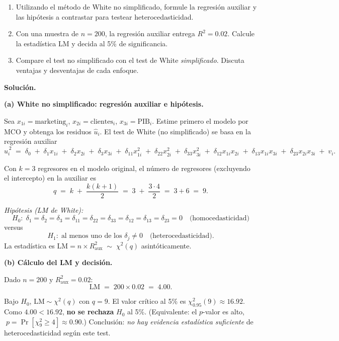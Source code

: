 \documentclass[10pt,a4paper]{article}
\begin{document}
\begin{enumerate}
\begin{enumerate}
\item Utilizando el método de White no simplificado, formule la {regresión auxiliar} y las {hipótesis} a contrastar para testear heterocedasticidad.

\item Con una muestra de \(n=200\), la regresión auxiliar entrega \(R^2 = 0{.}02\).
Calcule la estadística LM y decida al 5\% de significancia.

\item Compare el test no simplificado con el test de White \emph{simplificado}. Discuta ventajas y desventajas de cada enfoque.
\end{enumerate}


\textbf{Solución.}

\textbf{(a) White no simplificado: regresión auxiliar e hipótesis.}

Sea \(x_{1i}=\text{marketing}_i\), \(x_{2i}=\text{clientes}_i\), \(x_{3i}=\text{PIB}_i\).
Estime primero el modelo por MCO y obtenga los residuos \(\hat u_i\).
El test de White (no simplificado) se basa en la regresión auxiliar
\[
\hat u_i^{\,2} \;=\; \delta_0 \;+\; \delta_1 x_{1i} \;+\; \delta_2 x_{2i} \;+\; \delta_3 x_{3i}
\;+\; \delta_{11} x_{1i}^2 \;+\; \delta_{22} x_{2i}^2 \;+\; \delta_{33} x_{3i}^2
\;+\; \delta_{12} x_{1i}x_{2i} \;+\; \delta_{13} x_{1i}x_{3i} \;+\; \delta_{23} x_{2i}x_{3i} \;+\; v_i.
\]

Con \(k=3\) regresores en el modelo original, el número de regresores (excluyendo el intercepto) en la auxiliar es
\[
q \;=\; k \;+\; \frac{k(k+1)}{2}
\;=\; 3 \;+\; \frac{3\cdot 4}{2}
\;=\; 3 + 6 \;=\; 9.
\]

\noindent\emph{Hipótesis (LM de White):}
\[
H_0:\; \delta_1=\delta_2=\delta_3=\delta_{11}=\delta_{22}=\delta_{33}=\delta_{12}=\delta_{13}=\delta_{23}=0
\quad\text{(homocedasticidad)}
\]
versus
\[
H_1:\; \text{al menos uno de los } \delta_j \neq 0
\quad\text{(heterocedasticidad)}.
\]
La estadística es \(\text{LM} = n \times R^2_{\text{aux}} \;\sim\; \chi^2(q)\) asintóticamente.

\medskip
\textbf{(b) Cálculo del LM y decisión.}

Dado \(n=200\) y \(R^2_{\text{aux}}=0{.}02\):
\[
\text{LM} \;=\; 200 \times 0{.}02 \;=\; 4{.}00.
\]

Bajo \(H_0\), \(\text{LM}\sim \chi^2(q)\) con \(q=9\).
El valor crítico al 5\% es \(\chi^2_{0.95}(9)\approx 16{.}92\).
Como \(4{.}00 < 16{.}92\), \textbf{no se rechaza} \(H_0\) al 5\%.
(Equivalente: el \(p\)-valor es alto, \(\;p=\Pr[\chi^2_9\ge 4]\approx 0{.}90\).)
Conclusión: \emph{no hay evidencia estadística suficiente} de heterocedasticidad según este test.


\end{enumerate}
\end{document}
